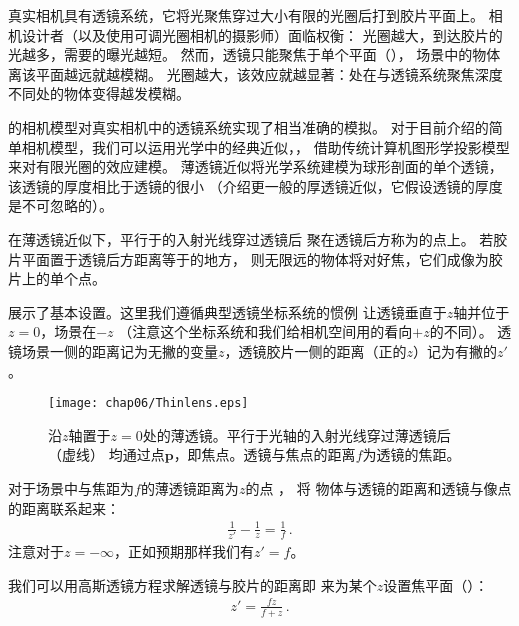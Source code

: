 真实相机具有透镜系统，它将光聚焦穿过大小有限的光圈后打到胶片平面上。
相机设计者（以及使用可调光圈相机的摄影师）面临权衡：
光圈越大，到达胶片的光越多，需要的曝光越短。
然而，透镜只能聚焦于单个平面（），
场景中的物体离该平面越远就越模糊。
光圈越大，该效应就越显著：处在与透镜系统聚焦深度不同处的物体变得越发模糊。

的相机模型对真实相机中的透镜系统实现了相当准确的模拟。
对于目前介绍的简单相机模型，我们可以运用光学中的经典近似，，
借助传统计算机图形学投影模型来对有限光圈的效应建模。
薄透镜近似将光学系统建模为球形剖面的单个透镜，
该透镜的厚度相比于透镜的很小
（介绍更一般的厚透镜近似，它假设透镜的厚度是不可忽略的）。

在薄透镜近似下，平行于的入射光线穿过透镜后
聚在透镜后方称为的点上。
若胶片平面置于透镜后方距离等于的地方，
则无限远的物体将对好焦，它们成像为胶片上的单个点。

展示了基本设置。这里我们遵循典型透镜坐标系统的惯例
让透镜垂直于$z$轴并位于$z=0$，场景在$-z$
（注意这个坐标系统和我们给相机空间用的看向$+z$的不同）。
透镜场景一侧的距离记为无撇的变量$z$，透镜胶片一侧的距离（正的$z$）记为有撇的$z'$。
\begin{figure}[htbp]
    \centering\texttt{[image: chap06/Thinlens.eps]}
    \caption{沿$z$轴置于$z=0$处的薄透镜。平行于光轴的入射光线穿过薄透镜后（虚线）
        均通过点$\bm p$，即焦点。透镜与焦点的距离$f$为透镜的焦距。}
    \label{fig:6.6}
\end{figure}

对于场景中与焦距为$f$的薄透镜距离为$z$的点
，
将
物体与透镜的距离和透镜与像点的距离联系起来：
\begin{align}\label{eq:6.1}
    \frac{1}{z'}-\frac{1}{z}=\frac{1}{f}\, .
\end{align}
注意对于$z=-\infty$，正如预期那样我们有$z'=f$。

我们可以用高斯透镜方程求解透镜与胶片的距离即
来为某个$z$设置焦平面（）：
\begin{align}\label{eq:6.2}
    z'=\frac{fz}{f+z}\, .
\end{align}

